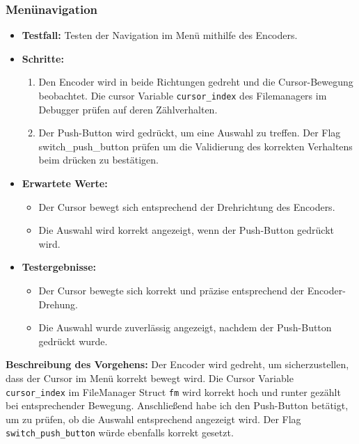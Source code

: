 \subsubsection{Menünavigation}
\begin{itemize}
	\item \textbf{Testfall:} Testen der Navigation im Menü mithilfe des Encoders.
	\item \textbf{Schritte:}
	\begin{enumerate}
		\item Den Encoder wird in beide Richtungen gedreht und die Cursor-Bewegung beobachtet. Die cursor Variable \texttt{cursor\_index} des Filemanagers  im Debugger prüfen auf deren Zählverhalten.
		\item Der Push-Button wird gedrückt, um eine Auswahl zu treffen. Der Flag switch\_push\_button prüfen um die Validierung des korrekten Verhaltens beim drücken zu bestätigen.
	\end{enumerate}
	\item \textbf{Erwartete Werte:}
	\begin{itemize}
		\item Der Cursor bewegt sich entsprechend der Drehrichtung des Encoders.
		\item Die Auswahl wird korrekt angezeigt, wenn der Push-Button gedrückt wird.
	\end{itemize}
	
	\item \textbf{Testergebnisse:}
	\begin{itemize}
		\item Der Cursor bewegte sich korrekt und präzise entsprechend der Encoder-Drehung.
		\item Die Auswahl wurde zuverlässig angezeigt, nachdem der Push-Button gedrückt wurde.
	\end{itemize}
\end{itemize}

\textbf{Beschreibung des Vorgehens:} 
Der Encoder wird gedreht, um sicherzustellen, dass der Cursor im Menü korrekt bewegt wird. Die Cursor Variable \texttt{cursor\_index} im FileManager Struct \texttt{fm} wird korrekt hoch und runter gezählt bei entsprechender Bewegung. Anschließend habe ich den Push-Button betätigt, um zu prüfen, ob die Auswahl entsprechend angezeigt wird.  Der Flag \texttt{switch\_push\_button} würde ebenfalls korrekt gesetzt.